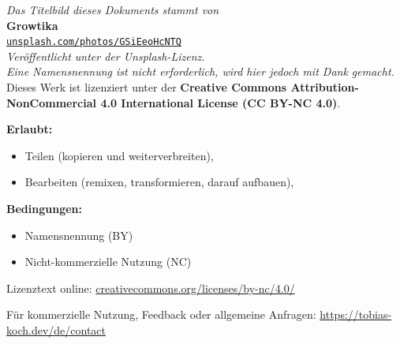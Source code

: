 \documentclass[a4paper,10pt]{scrreport}
\title{}
\date{}
\author{}
\let\oldtexttt\texttt
\renewcommand{\texttt}[1]{{\normalsize\oldtexttt{#1}}}
\begin{document}
\maketitle
\thispagestyle{empty}
\vspace*{6cm}
\begin{center}
    \textit{Das Titelbild dieses Dokuments stammt von} \\[0.8cm]
    {\Large\textbf{Growtika}} \\[0.5cm]
    \href{https://unsplash.com/photos/GSiEeoHcNTQ}{\texttt{unsplash.com/photos/GSiEeoHcNTQ}} \\[1cm]
    \textit{Veröffentlicht unter der Unsplash-Lizenz.} \\[0.3cm]
    \textit{Eine Namensnennung ist nicht erforderlich, wird hier jedoch mit Dank gemacht.}\\
    \vspace{1cm}
    Dieses Werk ist lizenziert unter der \textbf{Creative Commons Attribution-NonCommercial 4.0 International License (CC BY-NC 4.0)}.

\vspace{0.5cm}

\textbf{Erlaubt:}
\begin{itemize}
    \item Teilen (kopieren und weiterverbreiten),
    \item Bearbeiten (remixen, transformieren, darauf aufbauen),
\end{itemize}

\textbf{Bedingungen:}
\begin{itemize}
    \item Namensnennung (BY)
    \item Nicht-kommerzielle Nutzung (NC)
\end{itemize}

\noindent
Lizenztext online: \href{https://creativecommons.org/licenses/by-nc/4.0/}{creativecommons.org/licenses/by-nc/4.0/}

\vspace{0.5cm}

\noindent
Für kommerzielle Nutzung, Feedback oder allgemeine Anfragen: \href{https://tobias-koch.dev/de/contact}{https://tobias-koch.dev/de/contact}
\end{center}

\clearpage




\setcounter{page}{1}
\end{document}
